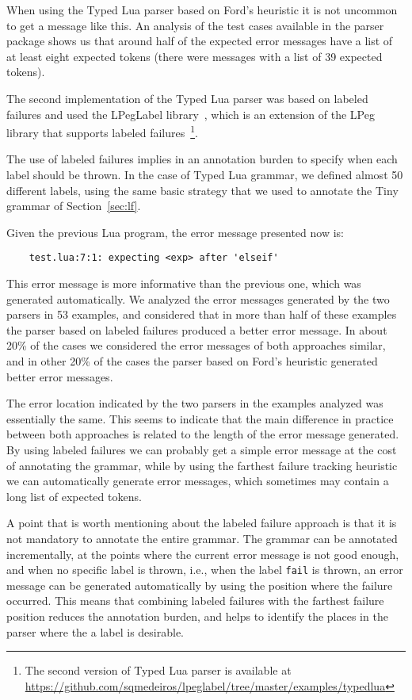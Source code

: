 \documentclass[3p,12pt,singlecolumn]{elsarticle}
\begin{document}
When using the Typed Lua parser based on Ford's heuristic it is not
uncommon to get a message like this. An analysis of the test cases
available in the parser package shows us that around half of the
expected error messages have a list of at least eight expected tokens
(there were messages with a list of 39 expected tokens).

The second implementation of the Typed Lua parser was 
based on labeled failures and used the LPegLabel library~\cite{lpeglabel},
which is an extension of the LPeg library that supports
labeled failures~\footnote{The second version of Typed Lua parser is available at
\url{https://github.com/sqmedeiros/lpeglabel/tree/master/examples/typedlua}}.

The use of labeled failures implies in an annotation burden to
specify when each label should be thrown. In the case of Typed Lua grammar,
we defined almost 50 different labels, using the same basic strategy
that we used to annotate the Tiny grammar of Section~\ref{sec:lf}.

Given the previous Lua program, the error message presented now is:
\begin{verbatim}
    test.lua:7:1: expecting <exp> after 'elseif'
\end{verbatim}

This error message is more informative than the previous one,
which was generated automatically. We analyzed the error
messages generated by the two parsers in 53 examples,
and considered that in more than half of these examples
the parser based on labeled failures produced a better
error message. In about 20\% of the cases we considered
the error messages of both approaches similar, and in other
20\% of the cases the parser based on Ford's heuristic
generated better error messages.

The error location indicated by the two parsers in the examples
analyzed was essentially the same. This seems to indicate that
the main difference in practice between both approaches is related
to the length of the error message generated. By using labeled
failures we can probably get a simple error message at the cost
of annotating the grammar, while by using the farthest failure
tracking heuristic we can automatically generate error messages,
which sometimes may contain a long list of expected tokens.

A point that is worth mentioning about the labeled failure approach
is that it is not mandatory to annotate the entire grammar. The grammar
can be annotated incrementally, at the points where the current error
message is not good enough, and when no specific label is thrown, i.e.,
when the label \texttt{fail} is thrown, an error message can be
generated automatically by using the position where the failure
occurred. This means that combining labeled failures with the farthest
failure position reduces the annotation burden, and helps to
identify the places in the parser where the a label is desirable.
\end{document}
